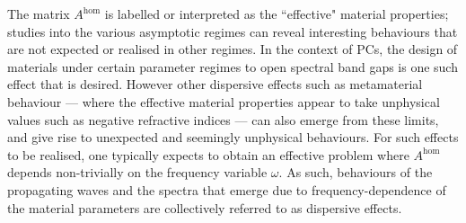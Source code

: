 The matrix $A^{\mathrm{hom}}$ is labelled or interpreted as the ``effective" material properties; studies into the various asymptotic regimes can reveal interesting behaviours that are not expected or realised in other regimes.
In the context of PCs, the design of materials under certain parameter regimes to open spectral band gaps is one such effect that is desired.
However other dispersive effects such as metamaterial behaviour --- where the effective material properties appear to take unphysical values such as negative refractive indices --- can also emerge from these limits, and give rise to unexpected and seemingly unphysical behaviours.
For such effects to be realised, one typically expects to obtain an effective problem where $A^{\mathrm{hom}}$ depends non-trivially on the frequency variable $\omega$.
As such, behaviours of the propagating waves and the spectra that emerge due to frequency-dependence of the material parameters are collectively referred to as dispersive effects.

